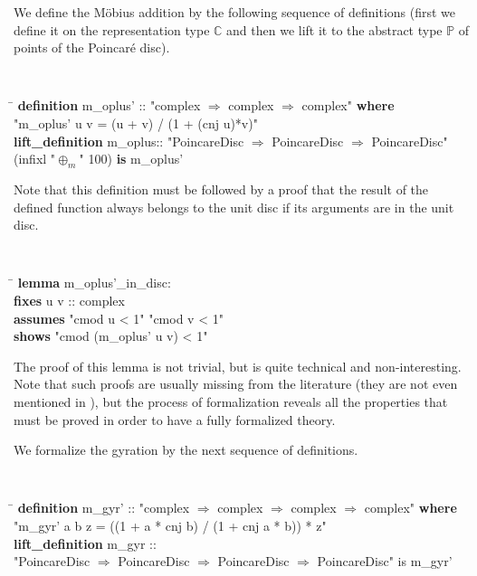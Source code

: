 \documentclass[a4paper]{article}
\newcommand{\tab}{\hspace{5mm}}
\theoremstyle{definition}
\begin{document}
We define the M\"obius addition by the following sequence of
definitions (first we define it on the representation type
$\mathbb{C}$ and then we lift it to the abstract type $\mathbb{P}$ of
points of the Poincar\'e disc).

{\tt
\begin{small}
\begin{tabbing}
\hspace{5mm}\=\kill
{\bf definition} m\_oplus' :: "complex $\Rightarrow$ complex $\Rightarrow$ complex" {\bf where}\\
\tab "m\_oplus' u v = (u + v) / (1 + (cnj u)*v)"\\

{\bf lift\_definition} m\_oplus:: "PoincareDisc $\Rightarrow$ PoincareDisc $\Rightarrow$ PoincareDisc" \\
\tab (infixl "$\oplus_m$" 100) {\bf is} m\_oplus'
\end{tabbing}
\end{small}
}

Note that this definition must be followed by a proof that the result
of the defined function always belongs to the unit disc if its
arguments are in the unit disc.

{\tt
\begin{small}
\begin{tabbing}
\hspace{5mm}\=\kill
{\bf lemma} m\_oplus'\_in\_disc:\\
\>  {\bf fixes} u v :: complex\\
\>  {\bf assumes} "cmod u < 1" "cmod v < 1"\\
\>  {\bf shows} "cmod (m\_oplus' u v) < 1"
\end{tabbing}
\end{small}
}

\noindent The proof of this lemma is not trivial, but is quite
technical and non-interesting. Note that such proofs are usually
missing from the literature (they are not even mentioned in
\cite{ungar-analytic}), but the process of formalization reveals all
the properties that must be proved in order to have a fully formalized
theory.

We formalize the gyration by the next sequence of definitions.

{\tt
\begin{small}
\begin{tabbing}
\hspace{5mm}\=\kill
{\bf definition} m\_gyr' :: "complex $\Rightarrow$ complex $\Rightarrow$ complex $\Rightarrow$ complex" {\bf where}\\
\>  "m\_gyr' a b z = ((1 + a * cnj b) / (1 + cnj a * b)) * z"\\
{\bf lift\_definition} m\_gyr ::\\
\>"PoincareDisc $\Rightarrow$ PoincareDisc $\Rightarrow$ PoincareDisc $\Rightarrow$ PoincareDisc" is m\_gyr'
\end{tabbing}
\end{small}
}
\end{document}
